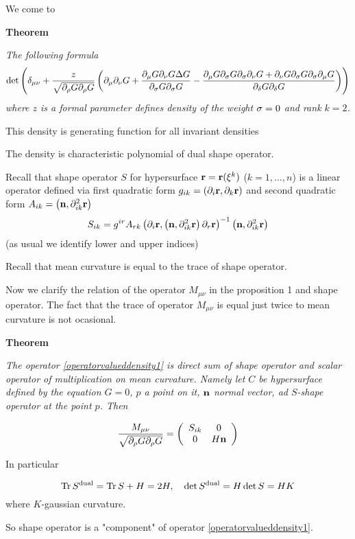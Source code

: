 \documentclass[12pt]{article}
\theoremstyle{theorem}
\begin{document}
We come to

\bigskip

{\bf Theorem}
{\it The following formula
 \begin{equation}\label{operatorvalueddensity1}
                       \det
                       \left(\delta_{\mu\nu}+
                 {z\over \sqrt {\partial_\rho G\partial_\rho G}} \left(
   \partial_\mu\partial_\nu G+{\partial_\mu G\partial_\nu G\Delta G\over \partial_{\sigma} G\partial_{\sigma} G}
  -{\partial_\mu G\partial_{\sigma} G\partial_{\sigma}\partial_\nu G+\partial_\nu G\partial_{\sigma} G\partial_{\sigma}\partial_\mu G
  \over \partial_\delta G\partial_\delta G}\right)\right)
\end{equation}
where $z$ is a formal parameter
defines density of the weight ${\sigma}=0$ and rank $k=2$.


This density is generating function for all invariant densities
}



\bigskip  The density is characteristic polynomial of dual shape operator.


Recall that shape operator $S$ for hypersurface
${\bf r}={\bf r}(\xi^k)$ ($k=1,\dots,n$) is a linear operator defined via
first quadratic form $g_{ik}=\left(\partial_i{\bf r}, \partial_k{\bf r}\right)$
and second quadratic
form  $A_{ik}=\left({\bf n}, \partial^2_{ik}{\bf r}\right)$
                    \begin{equation}\label{usualshpaeoperator}
    S_{ik}=g^{ir}A_{rk}\left(\partial_i{\bf r},
    \left({\bf n}, \partial^2_{ik}{\bf r}\right)\partial_r{\bf r}\right)^{-1}\left({\bf n}, \partial^2_{ik}{\bf r}\right)
\end{equation}
(as usual we identify lower and upper indices)

Recall that mean curvature is equal to the trace of shape operator.

\bigskip

Now we clarify the relation of the operator $M_{\mu\nu}$ in the proposition 1
and shape operator. The fact that the trace of operator $M_{\mu\nu}$
is equal just twice to mean curvature is not ocasional.


{\bf Theorem}
{\it The operator \eqref{operatorvalueddensity1}
is direct sum of shape operator and scalar operator of multiplication on mean curvature.
Namely
let $C$ be hypersurface defined by the equation $G=0$,
 $p$ a point on it, $\bf n$ normal vector,
ad $S$-shape operator at the point $p$.  Then

\begin{equation}\label{directsum}
   {M_{\mu\nu}\over \sqrt {\partial_\rho G \partial_\rho G}}=
\left(
   \begin{array}{cc}
  S_{ik} & 0 \\
      0& H{\bf n} \\
   \end{array}
   \right)
\end{equation}

In particular

\begin{equation}\label{formulaefordulashape}
    {\rm Tr\,} S^{\rm dual}={\rm Tr\,} S+H=2H,\quad \det S^{\rm dual}=H\det S=HK
\end{equation}
where $K$-gaussian curvature.


So shape operator is a "component" of operator \eqref{operatorvalueddensity1}.}
\end{document}
